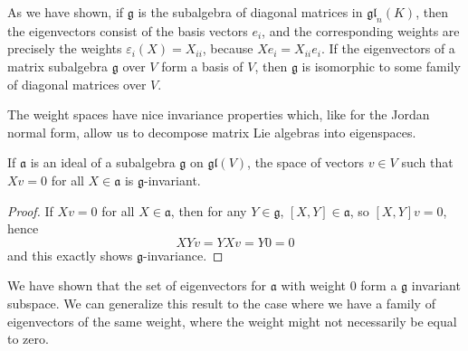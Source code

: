 \begin{example}
    As we have shown, if $\mathfrak{g}$ is the subalgebra of diagonal matrices in $\mathfrak{gl}_n(K)$, then the eigenvectors consist of the basis vectors $e_i$, and the corresponding weights are precisely the weights $\varepsilon_i(X) = X_{ii}$, because $Xe_i = X_{ii} e_i$. If the eigenvectors of a matrix subalgebra $\mathfrak{g}$ over $V$ form a basis of $V$, then $\mathfrak{g}$ is isomorphic to some family of diagonal matrices over $V$.
\end{example}

The weight spaces have nice invariance properties which, like for the Jordan normal form, allow us to decompose matrix Lie algebras into eigenspaces.

\begin{lemma}
    If $\mathfrak{a}$ is an ideal of a subalgebra $\mathfrak{g}$ on $\mathfrak{gl}(V)$, the space of vectors $v \in V$ such that $Xv = 0$ for all $X \in \mathfrak{a}$ is $\mathfrak{g}$-invariant.
\end{lemma}
\begin{proof}
    If $Xv = 0$ for all $X \in \mathfrak{a}$, then for any $Y \in \mathfrak{g}$, $[X,Y] \in \mathfrak{a}$, so $[X,Y]v = 0$, hence
    \[ XYv = YXv = Y0 = 0 \]
    and this exactly shows $\mathfrak{g}$-invariance.
\end{proof}

We have shown that the set of eigenvectors for $\mathfrak{a}$ with weight 0 form a $\mathfrak{g}$ invariant subspace. We can generalize this result to the case where we have a family of eigenvectors of the same weight, where the weight might not necessarily be equal to zero.

